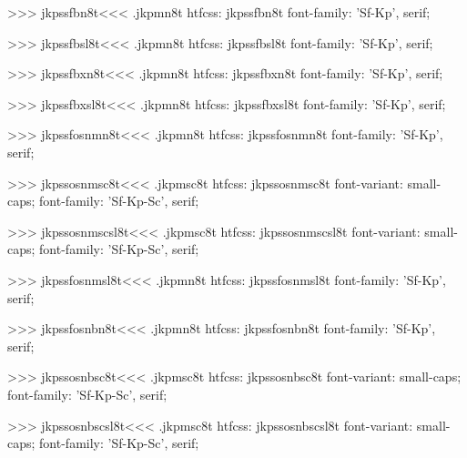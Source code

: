 >>>
\<jkpssfbn8t\><<<
.jkpmn8t
htfcss:  jkpssfbn8t  font-family: 'Sf-Kp', serif;

>>>
\<jkpssfbsl8t\><<<
.jkpmn8t
htfcss:  jkpssfbsl8t  font-family: 'Sf-Kp', serif;

>>>
\<jkpssfbxn8t\><<<
.jkpmn8t
htfcss:  jkpssfbxn8t  font-family: 'Sf-Kp', serif;

>>>
\<jkpssfbxsl8t\><<<
.jkpmn8t
htfcss:  jkpssfbxsl8t  font-family: 'Sf-Kp', serif;

>>>
\<jkpssfosnmn8t\><<<
.jkpmn8t
htfcss:  jkpssfosnmn8t  font-family: 'Sf-Kp', serif;

>>>
\<jkpssosnmsc8t\><<<
.jkpmsc8t
htfcss:  jkpssosnmsc8t  font-variant: small-caps; font-family: 'Sf-Kp-Sc', serif;

>>>
\<jkpssosnmscsl8t\><<<
.jkpmsc8t
htfcss:  jkpssosnmscsl8t  font-variant: small-caps; font-family: 'Sf-Kp-Sc', serif;

>>>
\<jkpssfosnmsl8t\><<<
.jkpmn8t
htfcss:  jkpssfosnmsl8t  font-family: 'Sf-Kp', serif;

>>>
\<jkpssfosnbn8t\><<<
.jkpmn8t
htfcss:  jkpssfosnbn8t  font-family: 'Sf-Kp', serif;

>>>
\<jkpssosnbsc8t\><<<
.jkpmsc8t
htfcss:  jkpssosnbsc8t  font-variant: small-caps; font-family: 'Sf-Kp-Sc', serif;

>>>
\<jkpssosnbscsl8t\><<<
.jkpmsc8t
htfcss:  jkpssosnbscsl8t  font-variant: small-caps; font-family: 'Sf-Kp-Sc', serif;

